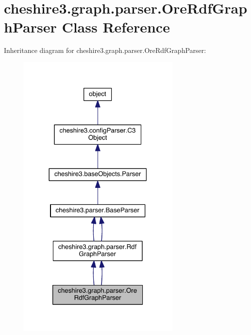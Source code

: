 \hypertarget{classcheshire3_1_1graph_1_1parser_1_1_ore_rdf_graph_parser}{\section{cheshire3.\-graph.\-parser.\-Ore\-Rdf\-Graph\-Parser Class Reference}
\label{classcheshire3_1_1graph_1_1parser_1_1_ore_rdf_graph_parser}
}


Inheritance diagram for cheshire3.\-graph.\-parser.\-Ore\-Rdf\-Graph\-Parser\-:
\nopagebreak
\begin{figure}[H]
\begin{center}
\leavevmode
\includegraphics[width=230pt]{classcheshire3_1_1graph_1_1parser_1_1_ore_rdf_graph_parser__inherit__graph}
\end{center}
\end{figure}


